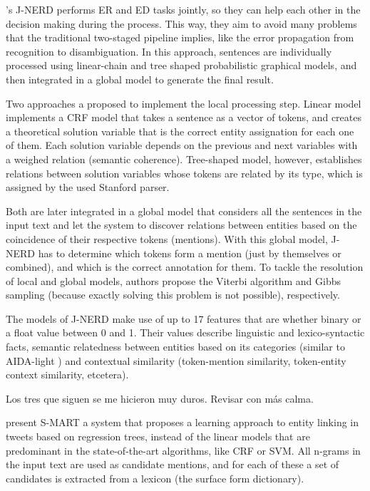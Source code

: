 \medskip

\cite{nguyen2016}'s J-NERD performs ER and ED tasks jointly, so they can help each other in the decision making during the process. This way, they aim to avoid many problems that the traditional two-staged pipeline implies, like the error propagation from recognition to disambiguation. In this approach, sentences are individually processed using linear-chain and tree shaped probabilistic graphical models, and then integrated in a global model to generate the final result.

Two approaches a proposed to implement the local processing step. Linear model implements a CRF model that takes a sentence as a vector of tokens, and creates a theoretical solution variable that is the correct entity assignation for each one of them. Each solution variable depends on the previous and next variables with a weighed relation (semantic coherence). Tree-shaped model, however, establishes relations between solution variables whose tokens are related by its type, which is assigned by the used Stanford parser.

Both are later integrated in a global model that considers all the sentences in the input text and let the system to discover relations between entities based on the coincidence of their respective tokens (mentions). With this global model, J-NERD has to determine which tokens form a mention (just by themselves or combined), and which is the correct annotation for them. To tackle the resolution of local and global models, authors propose the Viterbi algorithm and Gibbs sampling (because exactly solving this problem is not possible), respectively.

The models of J-NERD make use of up to 17 features that are whether binary or a float value between 0 and 1. Their values describe linguistic and lexico-syntactic facts, semantic relatedness between entities based on its categories (similar to AIDA-light \cite{nguyen2014}) and contextual similarity (token-mention similarity, token-entity context similarity, etcetera).

\medskip

{\color{red} Los tres que siguen se me hicieron muy duros. Revisar con más calma.}

\cite{ganea2016}

\medskip

\cite{yang2016} present S-MART a system that proposes a learning approach to entity linking in tweets based on regression trees, instead of the linear models that are predominant in the state-of-the-art algorithms, like CRF or SVM. All n-grams in the input text are used as candidate mentions, and for each of these a set of candidates is extracted from a lexicon (the surface form dictionary).

